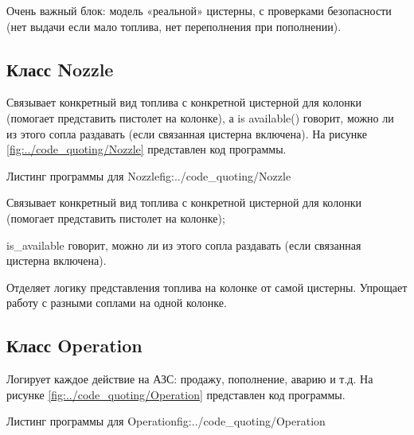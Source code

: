 \documentclass{vvsu}
\begin{document}
  Очень важный блок: модель «реальной» цистерны, с проверками безопасности (нет выдачи если мало топлива, нет переполнения при пополнении).


\subsection{Класс Nozzle}
  Связывает конкретный вид топлива с конкретной цистерной для колонки (помогает представить пистолет на колонке), а is available() говорит, можно ли из этого сопла раздавать (если связанная цистерна включена).
На рисунке \ref{fig:../code_quoting/Nozzle} представлен код программы.

\begin{vvsu_figure}{Листинг программы для Nozzle}{fig:../code_quoting/Nozzle}
  \begin{minipage}{.75\textwidth}
    
  \end{minipage}
\end{vvsu_figure}

\begin{vvsu_itemize}
  \item Связывает конкретный вид топлива с конкретной цистерной для колонки (помогает представить пистолет на колонке);
  \item is\_available говорит, можно ли из этого сопла раздавать (если связанная цистерна включена).
\end{vvsu_itemize}
  
  Отделяет логику представления топлива на колонке от самой цистерны. Упрощает работу с разными соплами на одной колонке.

\subsection{Класс Operation}
  Логирует каждое действие на АЗС: продажу, пополнение, аварию и т.д.
На рисунке \ref{fig:../code_quoting/Operation} представлен код программы.

\begin{vvsu_figure}{Листинг программы для Operation}{fig:../code_quoting/Operation}
  \begin{minipage}{.75\textwidth}
    
  \end{minipage}
\end{vvsu_figure}
\end{document}
